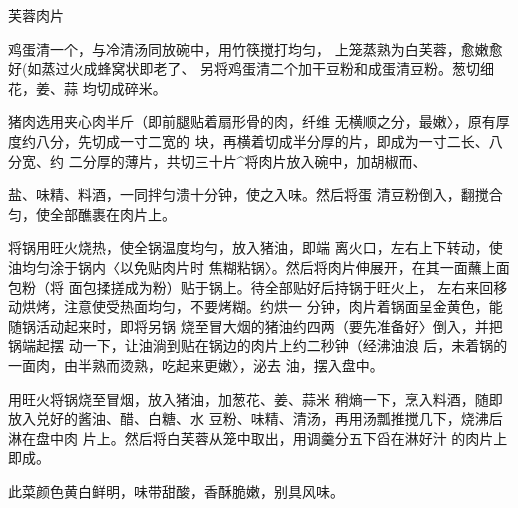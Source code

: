 \begin{recipe}{芙蓉肉片}

\ingredients



\cooking

\step 	鸡蛋清一个，与冷清汤同放碗中，用竹筷搅打均匀， 上笼蒸熟为白芙蓉，愈嫩愈好(如蒸过火成蜂窝状即老了、 另将鸡蛋清二个加干豆粉和成蛋清豆粉。葱切细花，姜、蒜 均切成碎米。

\step 	猪肉选用夹心肉半斤（即前腿贴着扇形骨的肉，纤维 无横顺之分，最嫩〉，原有厚度约八分，先切成一寸二宽的 块，再横着切成半分厚的片，即成为一寸二长、八分宽、约 二分厚的薄片，共切三十片^将肉片放入碗中，加胡椒而、

盐、味精、料酒，一同拌匀溃十分钟，使之入味。然后将蛋 清豆粉倒入，翻搅合匀，使全部醮裹在肉片上。

\step 将锅用旺火烧热，使全锅温度均勻，放入猪油，即端 离火口，左右上下转动，使油均匀涂于锅内〈以免贴肉片时 焦糊粘锅〉。然后将肉片伸展开，在其一面蘸上面包粉（将 面包揉搓成为粉）贴于锅上。待全部贴好后持锅于旺火上， 左右来回移动烘烤，注意使受热面均匀，不要烤糊。约烘一 分钟，肉片着锅面呈金黄色，能随锅活动起来时，即将另锅 烧至冒大烟的猪油约四两（要先准备好〉倒入，并把锅端起摆 动一下，让油淌到贴在锅边的肉片上约二秒钟（经沸油浪 后，未着锅的一面肉，由半熟而烫熟，吃起来更嫩〉，泌去 油，摆入盘中。

\step 用旺火将锅烧至冒烟，放入猪油，加葱花、姜、蒜米 稍熵一下，烹入料酒，随即放入兑好的酱油、醋、白糖、水 豆粉、味精、清汤，再用汤瓢推搅几下，烧沸后淋在盘中肉 片上。然后将白芙蓉从笼中取出，用调羹分五下舀在淋好汁 的肉片上即成。

\notes

此菜颜色黄白鲜明，味带甜酸，香酥脆嫩，别具风味。

\end{recipe}

